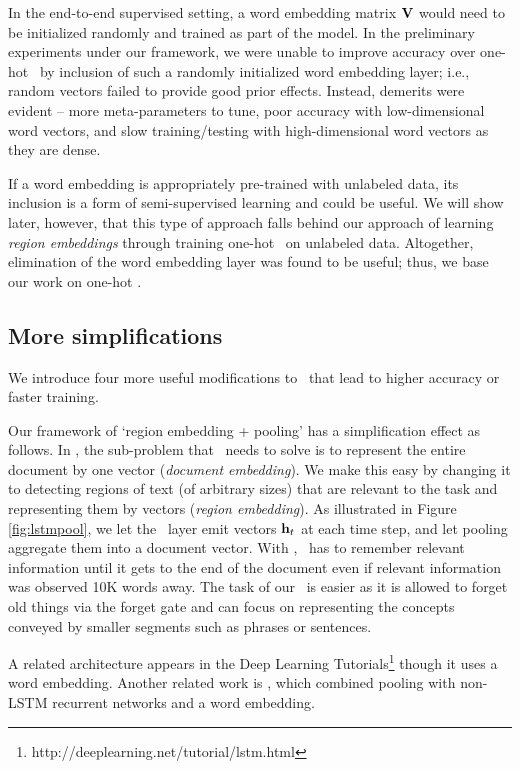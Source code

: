 \documentclass{article}
\begin{document}
In the end-to-end supervised setting, a word embedding matrix ${\mathbf V}$ would need to be initialized randomly and trained as part of the model. 
In the preliminary experiments under our framework, 
we were unable to improve accuracy over one-hot \lstm\ 
by inclusion of such a randomly initialized word embedding layer; i.e., 
random vectors failed to provide good prior effects. Instead, demerits 
were evident -- 
more meta-parameters to tune, 
poor accuracy with low-dimensional word vectors, and 
slow training/testing with high-dimensional word vectors as they are dense. 


If a word embedding is appropriately pre-trained with unlabeled data, 
its inclusion is a form of semi-supervised learning and could be useful.  
We will show later, however, 
that this type of approach falls behind our approach of learning {\em region embeddings} 
through training one-hot \lstm\ on unlabeled data.   
Altogether, elimination of the word embedding layer was found to be useful; 
thus, we base our work on one-hot \lstm. 


\subsection{More simplifications} 

We introduce four more useful modifications to \wvLstm\ 
that lead to higher accuracy or faster training.

Our framework of `region embedding + pooling' has a simplification effect as follows.   
In \wvLstm, the sub-problem that \lstm\ needs to solve is to represent the entire document 
by one vector ({\em document embedding}). We make this easy by changing it to detecting regions of text (of arbitrary sizes)  
that are relevant 
to the task and representing them by vectors ({\em region embedding}). 
As illustrated in Figure \ref{fig:lstmpool}, we let the \lstm\ layer emit vectors ${\mathbf h}_t$ at each time step, 
and let pooling aggregate them into a document vector.  
With \wvLstm, \lstm\ has to remember relevant information until it gets to the end of 
the document even if relevant information was observed 10K words away. 
The task of our \lstm\ is easier as it is allowed to forget old things via the forget gate 
and can focus on representing the concepts conveyed by smaller segments such as phrases or sentences.  


A related architecture appears in the Deep Learning Tutorials\footnote{
  {http://deeplearning.net/tutorial/lstm.html}
}
though it uses a word embedding.
Another related work is
\cite{LXLZ15}, which combined pooling with non-LSTM recurrent networks and a word embedding. 
\end{document}
